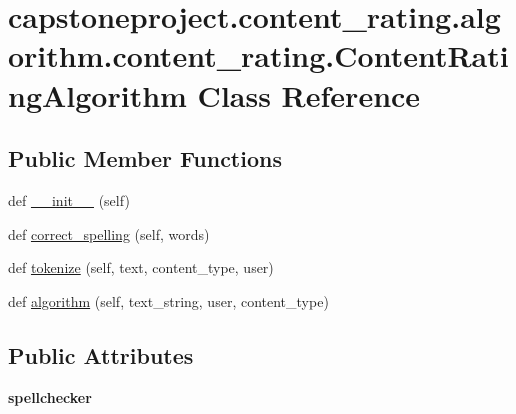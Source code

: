 \hypertarget{classcapstoneproject_1_1content__rating_1_1algorithm_1_1content__rating_1_1_content_rating_algorithm}{}\section{capstoneproject.\+content\+\_\+rating.\+algorithm.\+content\+\_\+rating.\+Content\+Rating\+Algorithm Class Reference}
\label{classcapstoneproject_1_1content__rating_1_1algorithm_1_1content__rating_1_1_content_rating_algorithm}
\subsection*{Public Member Functions}
\begin{DoxyCompactItemize}
\item 
def \mbox{\hyperlink{classcapstoneproject_1_1content__rating_1_1algorithm_1_1content__rating_1_1_content_rating_algorithm_abc5f346185684c1797fbd7338662deac}{\+\_\+\+\_\+init\+\_\+\+\_\+}} (self)
\item 
def \mbox{\hyperlink{classcapstoneproject_1_1content__rating_1_1algorithm_1_1content__rating_1_1_content_rating_algorithm_ac7a8c6b8bbe2a3f79cbbbcc7d1867fc4}{correct\+\_\+spelling}} (self, words)
\item 
def \mbox{\hyperlink{classcapstoneproject_1_1content__rating_1_1algorithm_1_1content__rating_1_1_content_rating_algorithm_aa1231998b1d540c0ea6979ccb241ac4f}{tokenize}} (self, text, content\+\_\+type, user)
\item 
def \mbox{\hyperlink{classcapstoneproject_1_1content__rating_1_1algorithm_1_1content__rating_1_1_content_rating_algorithm_a6c04fa093b9f7582a97aeb9d4d453048}{algorithm}} (self, text\+\_\+string, user, content\+\_\+type)
\end{DoxyCompactItemize}
\subsection*{Public Attributes}
\begin{DoxyCompactItemize}
\item 
\mbox{\label{classcapstoneproject_1_1content__rating_1_1algorithm_1_1content__rating_1_1_content_rating_algorithm_a9ab4b8322dccb24ddd553eca33ddac85}} 
{\bfseries spellchecker}
\end{DoxyCompactItemize}



